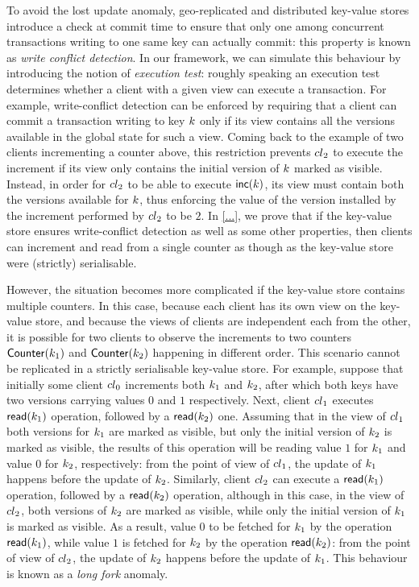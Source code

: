 To avoid the lost update anomaly, geo-replicated and distributed key-value stores 
introduce a check at commit time to ensure that only one among 
concurrent transactions writing to one same key can actually commit: this property is 
known as \emph{write conflict detection}. In our framework, we can simulate this behaviour 
by introducing the notion of \emph{execution test}: roughly speaking an execution test determines whether 
a client with a given view can execute a transaction. For example, write-conflict detection  
can be enforced by requiring that a client can commit a transaction writing to key $k$ only if 
its view contains all the versions available in the global state for such a view. Coming back to 
the example of two clients incrementing a counter above, this restriction prevents ${cl}_2$ 
to execute the increment if its view only contains the initial version of $k$ marked as visible. 
Instead, in order for ${cl}_2$ to be able to execute $\mathsf{inc}(k)$, its view must contain 
both the versions available for $k$, thus enforcing the value of the version installed by 
the increment performed by ${cl}_2$ to be $2$. In \cref{...}, we prove that if the key-value store 
ensures write-conflict detection as well as some other properties, then clients can increment 
and read from a single counter as though as the key-value store were (strictly) serialisable.

However, the situation becomes more complicated if the key-value store contains multiple counters. 
In this case, because each client has its own view on the key-value store, and because the views 
of clients are independent each from the other, it is possible for two 
clients to observe the increments to two counters $\mathsf{Counter}(k_1)$ and $\mathsf{Counter}(k_2)$ happening 
in different order. This scenario cannot be replicated in a strictly serialisable key-value store. 
For example, suppose that initially some client ${cl}_0$ increments both $k_1$ and $k_2$, 
after which both keys have two versions carrying values $0$ and $1$ respectively. 
Next, client ${cl}_1$ executes $\mathsf{read}(k_1)$ operation, followed by a $\mathsf{read}(k_2)$ one. 
Assuming that in the view of ${cl}_1$ both versions for $k_1$ are marked as visible, but only 
the initial version of $k_2$ is marked as visible, the results of this operation will be reading value $1$ 
for $k_1$ and value $0$ for $k_2$, respectively: from the point of view of ${cl}_1$, the update of $k_1$ 
happens before the update of $k_2$. Similarly, client ${cl}_2$ can execute a $\mathsf{read}(k_1)$ operation, 
followed by a $\mathsf{read}(k_2)$ operation, although in this case, in the view of ${cl}_2$, both versions of $k_2$ 
are marked as visible, while only the initial version of $k_1$ is marked as visible. As a result, 
value $0$ to be fetched for $k_1$ by the operation $\mathsf{read}(k_1)$, while value $1$ is fetched for $k_2$ by 
the operation $\mathsf{read}(k_2)$: from the point of view of ${cl}_2$, the update of $k_2$ happens before the update 
of $k_1$. This behaviour is known as a \emph{long fork} anomaly.

